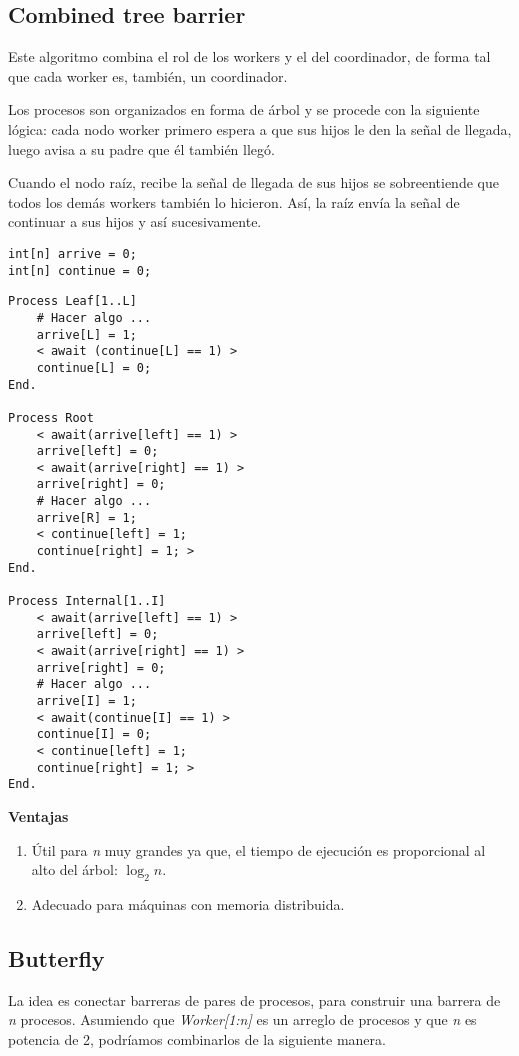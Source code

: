 \documentclass[a4paper, 10pt]{report}
\begin{document}
\subsection{Combined tree barrier}
Este algoritmo combina el rol de los workers y el del coordinador, de forma tal que cada worker es, también, un coordinador.

Los procesos son organizados en forma de árbol y se procede con la siguiente lógica: cada nodo worker primero espera a que sus hijos le den la señal de llegada, luego avisa a su padre que él también llegó.

Cuando el nodo raíz, recibe la señal de llegada de sus hijos se sobreentiende que todos los demás workers también lo hicieron. Así, la raíz envía la señal de continuar a sus hijos y así sucesivamente.

\begin{lstlisting}
int[n] arrive = 0;
int[n] continue = 0;
\end{lstlisting}
\begin{lstlisting}[multicols=2, firstnumber=3]
Process Leaf[1..L]
	# Hacer algo ...
	arrive[L] = 1;
	< await (continue[L] == 1) >
	continue[L] = 0;
End.

Process Root
	< await(arrive[left] == 1) >
	arrive[left] = 0;
	< await(arrive[right] == 1) >
	arrive[right] = 0;
	# Hacer algo ...
	arrive[R] = 1;
	< continue[left] = 1;
	continue[right] = 1; >
End.
	
Process Internal[1..I]
	< await(arrive[left] == 1) >
	arrive[left] = 0;
	< await(arrive[right] == 1) >
	arrive[right] = 0;
	# Hacer algo ...
	arrive[I] = 1;
	< await(continue[I] == 1) >
	continue[I] = 0;
	< continue[left] = 1; 
	continue[right] = 1; >
End.
\end{lstlisting}

\textbf{Ventajas}
\begin{enumerate}
	\item Útil para \emph{n} muy grandes ya que, el tiempo de ejecución es proporcional al alto del árbol: $\log_2n$.
	\item Adecuado para máquinas con memoria distribuida.
\end{enumerate}

\subsection{Butterfly}
La idea es conectar barreras de pares de procesos, para construir una barrera de \emph{n} procesos. Asumiendo que \emph{Worker[1:n]} es un arreglo de procesos y que \emph{n} es potencia de 2, podríamos combinarlos de la siguiente manera.
\end{document}
